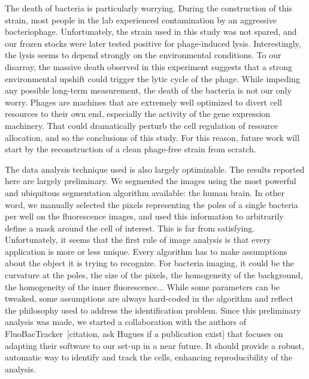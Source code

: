 The death of bacteria is particularly worrying.
During the construction of this strain, most people in the lab experienced contamination by an aggressive bacteriophage.
Unfortunately, the strain used in this study was not spared, and our frozen stocks were later tested positive for phage-induced lysis.
Interestingly, the lysis seems to depend strongly on the environmental conditions.
To our disarray, the massive death observed in this experiment suggests that a strong environmental upshift could trigger the lytic cycle of the phage.
While impeding any possible long-term measurement, the death of the bacteria is not our only worry.
Phages are machines that are extremely well optimized to divert cell resources to their own end, especially the activity of the gene expression machinery.
That could dramatically perturb the cell regulation of resource allocation, and so the conclusions of this study.
For this reason, future work will start by the reconstruction of a clean phage-free strain from scratch.

The data analysis technique used is also largely optimizable.
The results reported here are largely preliminary.
We segmented the images using the most powerful and ubiquitous segmentation algorithm available: the human brain.
In other word, we manually selected the pixels representing the poles of a single bacteria per well on the fluorescence images, and used this information to arbitrarily define a mask around the cell of interest.
This is far from satisfying.
Unfortunately, it seems that the first rule of image analysis is that every application is more or less unique.
Every algorithm has to make assumptions about the object it is trying to recognize.
For bacteria imaging, it could be the curvature at the poles, the size of the pixels, the homogeneity of the background, the homogeneity of the inner fluorescence...
While some parameters can be tweaked, some assumptions are always hard-coded in the algorithm and reflect the philosophy used to address the identification problem.
Since this preliminary analysis was made, we started a collaboration with the authors of FluoBacTracker~[citation, ask Hugues if a publication exist] that focuses on adapting their software to our set-up in a near future.
It should provide a robust, automatic way to identify and track the cells, enhancing reproducibility of the analysis.

